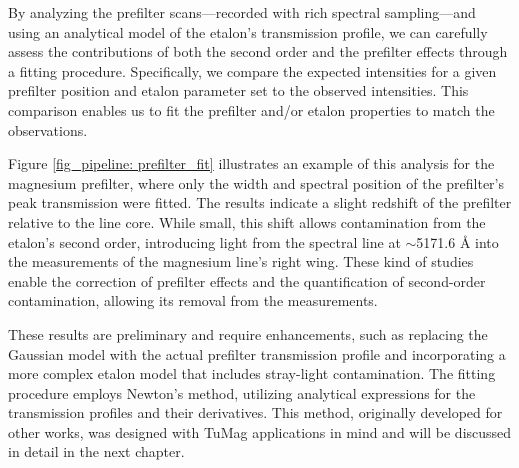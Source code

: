 By analyzing the prefilter scans—recorded with rich spectral sampling—and using an analytical model of the etalon's transmission profile, we can carefully assess the contributions of both the second order and the prefilter effects through a fitting procedure. Specifically, we compare the expected intensities for a given prefilter position and etalon parameter set to the observed intensities. This comparison enables us to fit the prefilter and/or etalon properties to match the observations.

Figure \ref{fig_pipeline: prefilter_fit} illustrates an example of this analysis for the magnesium prefilter, where only the width and spectral position of the prefilter’s peak transmission were fitted. The results indicate a slight redshift of the prefilter relative to the line core. While small, this shift allows contamination from the etalon’s second order, introducing light from the spectral line at $\sim$5171.6 \r{A} into the measurements of the magnesium line's right wing. These kind of studies enable the correction of prefilter effects and the quantification of second-order contamination, allowing its removal from the measurements.

These results are preliminary and require enhancements, such as replacing the Gaussian model with the actual prefilter transmission profile and incorporating a more complex etalon model that includes stray-light contamination. The fitting procedure employs Newton's method, utilizing analytical expressions for the transmission profiles and their derivatives. This method, originally developed for other works, was designed with TuMag applications in mind and will be discussed in detail in the next chapter.





